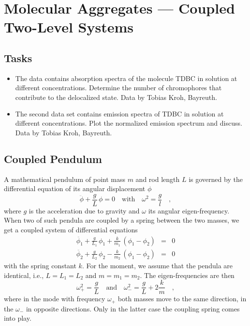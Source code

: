 \renewcommand{\lastmod}{May 20, 2021}
\renewcommand{\chapterauthors}{Markus Lippitz}


\chapter{Molecular Aggregates --- Coupled Two-Level Systems}
\label{chap:molecular_aggregates}


\section{Tasks}

\begin{itemize}
\item The data contains absorption spectra of the molecule TDBC in solution at different concentrations. Determine the number of chromophores that contribute to the delocalized state. Data by Tobias Kroh, Bayreuth.

\item The second data set contains emission spectra of TDBC in solution at different concentrations. Plot the normalized emission spectrum and discuss. Data by Tobias Kroh, Bayreuth.
\end{itemize}






\section{Coupled Pendulum}

A mathematical pendulum of point mass $m$ and rod length $L$ is governed by the differential equation of its angular displacement $\phi$
\begin{equation}
 \ddot{\phi} + \frac{g}{L} \, \phi = 0 \quad \text{with} \quad \omega^2 = \frac{g}{l}  \quad , 
\end{equation}
where $g$ is the acceleration due to gravity and $\omega$ its angular eigen-frequency. When two of such pendula are coupled by a spring between the two masses, we get a coupled system of differential equations
\begin{eqnarray}
 \ddot{\phi_1} + \frac{g}{L_1} \, \phi_1  + \frac{k}{m_1} \, \left( \phi_1  - \phi_2 \right)  & = &  0  \\
 \ddot{\phi_2} + \frac{g}{L_2} \, \phi_2  - \frac{k}{m_2} \, \left( \phi_1  - \phi_2 \right)  & = &  0  
\end{eqnarray}
with the spring constant $k$.  For the moment, we assume that the pendula are identical, i.e., $L = L_1 = L_2$ and $m = m_1 =m_2$. The eigen-frequencies are then
\begin{equation}
 \omega_{+}^2 = \frac{g}{L} \quad \text{and} \quad 
  \omega_{-}^2 = \frac{g}{L}  + 2 \frac{k}{m} \quad ,
\end{equation}
where in the mode with frequency $\omega_{+}$ both masses move to the same direction, in the $\omega_{-}$ in opposite directions. Only in the latter case the coupling spring comes into play.

